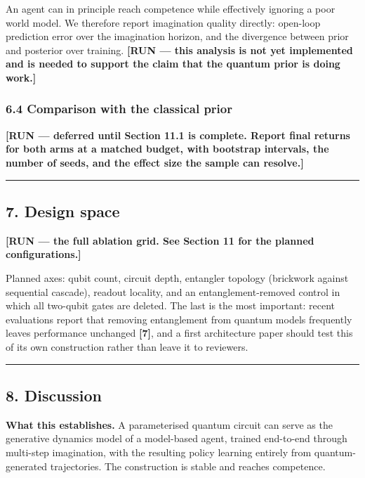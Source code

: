 \documentclass[
  11pt]{article}
\begin{document}
An agent can in principle reach competence while effectively ignoring a
poor world model. We therefore report imagination quality directly:
open-loop prediction error over the imagination horizon, and the
divergence between prior and posterior over training. \textbf{{[}RUN ---
this analysis is not yet implemented and is needed to support the claim
that the quantum prior is doing work.{]}}

\hypertarget{comparison-with-the-classical-prior}{%
\subsubsection{6.4 Comparison with the classical
prior}\label{comparison-with-the-classical-prior}}

\textbf{{[}RUN --- deferred until Section 11.1 is complete. Report final
returns for both arms at a matched budget, with bootstrap intervals, the
number of seeds, and the effect size the sample can resolve.{]}}

\begin{center}\rule{0.5\linewidth}{0.5pt}\end{center}

\hypertarget{design-space}{%
\subsection{7. Design space}\label{design-space}}

\textbf{{[}RUN --- the full ablation grid. See Section 11 for the
planned configurations.{]}}

Planned axes: qubit count, circuit depth, entangler topology (brickwork
against sequential cascade), readout locality, and an
entanglement-removed control in which all two-qubit gates are deleted.
The last is the most important: recent evaluations report that removing
entanglement from quantum models frequently leaves performance unchanged
\textbf{{[}7{]}}, and a first architecture paper should test this of its
own construction rather than leave it to reviewers.

\begin{center}\rule{0.5\linewidth}{0.5pt}\end{center}

\hypertarget{discussion}{%
\subsection{8. Discussion}\label{discussion}}

\textbf{What this establishes.} A parameterised quantum circuit can
serve as the generative dynamics model of a model-based agent, trained
end-to-end through multi-step imagination, with the resulting policy
learning entirely from quantum-generated trajectories. The construction
is stable and reaches competence.
\end{document}
